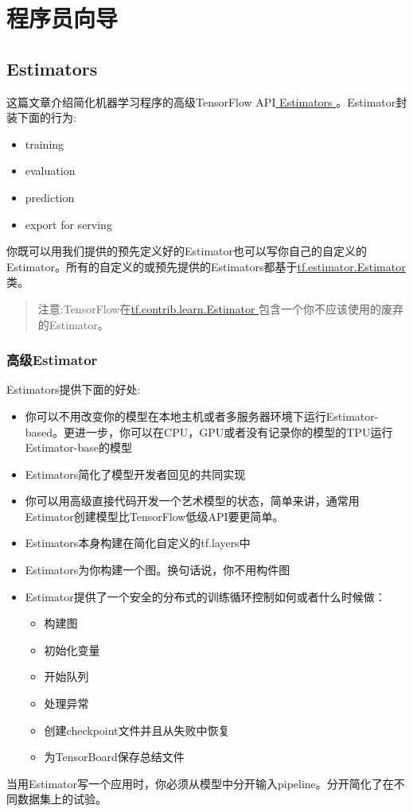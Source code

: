 \chapter{程序员向导}
\section{Estimators}
这篇文章介绍简化机器学习程序的高级TensorFlow API\href{https://www.tensorflow.org/api_docs/python/tf/estimator?hl=zh-cn}{ Estimators }。Estimator封装下面的行为:
\begin{itemize}
\item training
\item evaluation
\item prediction
\item export for serving
\end{itemize}
你既可以用我们提供的预先定义好的Estimator也可以写你自己的自定义的Estimator。所有的自定义的或预先提供的Estimators都基于\href{https://www.tensorflow.org/api_docs/python/tf/estimator/Estimator?hl=zh-cn}{tf.estimator.Estimator}类。
\begin{quote}
注意:TensorFlow在\href{https://www.tensorflow.org/api_docs/python/tf/contrib/learn/Estimator?hl=zh-cn}{tf.contrib.learn.Estimator }包含一个你不应该使用的废弃的Estimator。
\end{quote}
\subsection{高级Estimator}
Estimators提供下面的好处:
\begin{itemize}
\item 你可以不用改变你的模型在本地主机或者多服务器环境下运行Estimator-based。更进一步，你可以在CPU，GPU或者没有记录你的模型的TPU运行Estimator-base的模型
\item Estimators简化了模型开发者回见的共同实现
\item 你可以用高级直接代码开发一个艺术模型的状态，简单来讲，通常用Estimator创建模型比TensorFlow低级API要更简单。
\item Estimators本身构建在简化自定义的tf.layers中
\item Estimators为你构建一个图。换句话说，你不用构件图
\item Estimator提供了一个安全的分布式的训练循环控制如何或者什么时候做：
\begin{itemize}
\item 构建图
\item 初始化变量
\item 开始队列
\item 处理异常
\item 创建checkpoint文件并且从失败中恢复
\item 为TensorBoard保存总结文件
\end{itemize}
\end{itemize}
当用Estimator写一个应用时，你必须从模型中分开输入pipeline。分开简化了在不同数据集上的试验。
